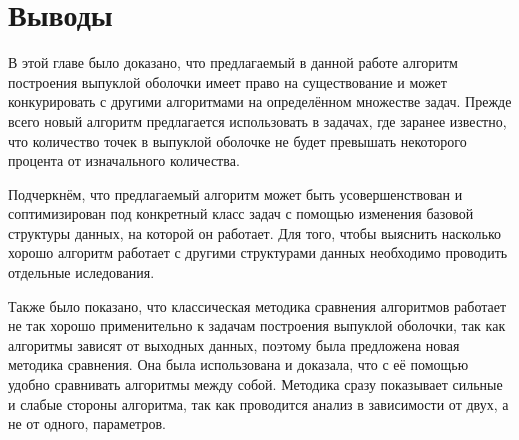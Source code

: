\section{Выводы}

В этой главе было доказано, что предлагаемый в данной работе алгоритм построения выпуклой оболочки имеет право на существование и может конкурировать с другими алгоритмами на определённом множестве задач. Прежде всего новый алгоритм предлагается использовать в задачах, где заранее известно, что количество точек в выпуклой оболочке не будет превышать некоторого процента от изначального количества.

Подчеркнём, что предлагаемый алгоритм может быть усовершенствован и соптимизирован под конкретный класс задач с помощью изменения базовой структуры данных, на которой он работает. Для того, чтобы выяснить насколько хорошо алгоритм работает с другими структурами данных необходимо проводить отдельные иследования.

Также было показано, что классическая методика сравнения алгоритмов работает не так хорошо применительно к задачам построения выпуклой оболочки, так как алгоритмы зависят от выходных данных, поэтому была предложена новая методика сравнения. Она была использована и доказала, что с её помощью удобно сравнивать алгоритмы между собой. Методика сразу показывает сильные и слабые стороны алгоритма, так как проводится анализ в зависимости от двух, а не от одного, параметров.
